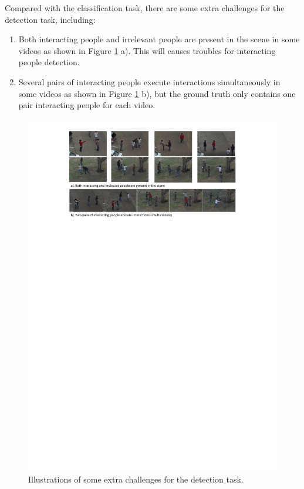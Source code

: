 Compared with the classification task, there are some extra challenges for the detection task, including:
\begin{enumerate}
	\item Both interacting people and irrelevant people are present in the scene in some videos as shown in Figure \ref{fig:ut_challenges_2} a). This will causes troubles for interacting people detection.
	\item Several pairs of interacting people execute interactions simultaneously in some videos as shown in Figure \ref{fig:ut_challenges_2} b), but the ground truth only contains one pair interacting people for each video. 
\end{enumerate}
\begin{figure}
	\includegraphics[trim=2cm 21.5cm 0cm 1cm]{figs/ut_challenges_2.pdf}
	\caption{Illustrations of some extra challenges for the detection task. }
	\label{fig:ut_challenges_2}
\end{figure}
